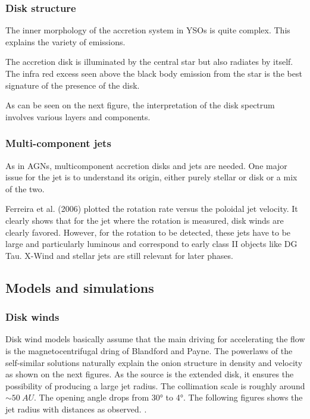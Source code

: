 \documentclass[10pt,a4paper,english]{article}
\begin{document}
\subsubsection{Disk structure}

The inner morphology of the accretion system in YSOs is quite complex. This explains the variety of emissions.

The accretion disk is illuminated by the central star but also radiates by itself. The infra red excess seen above the black body emission from the star is the best signature of the presence of the disk.

As can be seen on the next figure, the interpretation of the disk spectrum involves various layers and components.

\subsubsection{Multi-component jets}
As in AGNs, multicomponent accretion disks and jets are needed. One major issue for the jet is to understand its origin, either purely stellar or disk or a mix of the two.

Ferreira et al. (2006) plotted the rotation rate versus the poloidal jet velocity. It clearly shows that for the jet where the rotation is measured, disk winds are clearly favored. However, for the rotation to be detected, these jets have to be large and particularly luminous and correspond to early class II objects like DG Tau. X-Wind and stellar jets are still relevant for later phases.
\subsection{Models and simulations}

\subsubsection{Disk winds}
Disk wind models basically assume that the main driving for accelerating the flow is the magnetocentrifugal dring of Blandford and Payne. The powerlaws of the self-similar solutions naturally explain the onion structure in density and velocity as shown on the next figures.
As the source is the extended disk, it ensures the possibility of producing a large jet radius. The collimation scale is roughly around $\sim \SI{50}{AU}$. The opening angle drops from \ang{30} to \ang{4}. The following figures shows the jet radius with distances as observed. .
\end{document}
